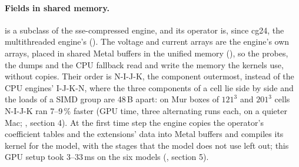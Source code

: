 \paragraph{Fields in shared memory.}  is a subclass of the sse-compressed engine, and its
operator is, since cg24, the multithreaded engine's (). The voltage and current arrays are
the engine's own  arrays, placed in shared Metal buffers in the unified memory
(), so the probes, the dumps and the CPU fallback read and write the memory the kernels use,
without copies. Their order is N-I-J-K, the component outermost, instead of the CPU engines' I-J-K-N, where the three
components of a cell lie side by side and the loads of a SIMD group are 48\,B apart: on Mur boxes of $121^3$ and
$201^3$ cells N-I-J-K ran 7--9\,\% faster (GPU time, three alternating runs each, on a quieter Mac;
, section 4). At the first time step the engine copies the
operator's coefficient tables and the extensions' data into Metal buffers and compiles its kernel for the model, with
the stages that the model does not use left out; this GPU setup took 3--33\,ms on the six models
(, section 5).

